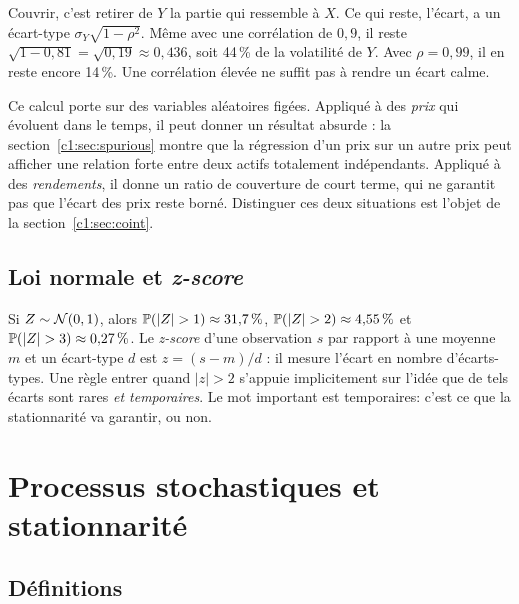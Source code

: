 \begin{intuition}
Couvrir, c'est retirer de $Y$ la partie qui \og ressemble\fg{} à $X$. Ce qui reste, l'écart, a un écart-type $\sigma_Y\sqrt{1-\rho^2}$. Même avec une corrélation de $0{,}9$, il reste $\sqrt{1-0{,}81} = \sqrt{0{,}19} \approx 0{,}436$, soit 44\,\% de la volatilité de $Y$. Avec $\rho = 0{,}99$, il en reste encore 14\,\%. Une corrélation \og élevée\fg{} ne suffit pas à rendre un écart calme.
\end{intuition}

\begin{pitfall}
Ce calcul porte sur des variables aléatoires \og figées\fg. Appliqué à des \emph{prix} qui évoluent dans le temps, il peut donner un résultat absurde : la section~\ref{c1:sec:spurious} montre que la régression d'un prix sur un autre prix peut afficher une relation forte entre deux actifs totalement indépendants. Appliqué à des \emph{rendements}, il donne un ratio de couverture de court terme, qui ne garantit pas que l'écart des prix reste borné. Distinguer ces deux situations est l'objet de la section~\ref{c1:sec:coint}.
\end{pitfall}

\subsection{Loi normale et \emph{z-score}}

Si $Z \sim \mathcal{N}(0,1)$, alors $\mathbb{P}(|Z| > 1) \approx 31{,}7\,\%$, $\Prob(|Z|>2) \approx 4{,}55\,\%$ et $\Prob(|Z|>3) \approx 0{,}27\,\%$. Le \emph{z-score} d'une observation $s$ par rapport à une moyenne $m$ et un écart-type $d$ est $z = (s-m)/d$ : il mesure l'écart \og en nombre d'écarts-types\fg. Une règle \og entrer quand $|z|>2$\fg{} s'appuie implicitement sur l'idée que de tels écarts sont rares \emph{et temporaires}. Le mot important est \og temporaires\fg : c'est ce que la stationnarité va garantir, ou non.

\section{Processus stochastiques et stationnarité}

\subsection{Définitions}

